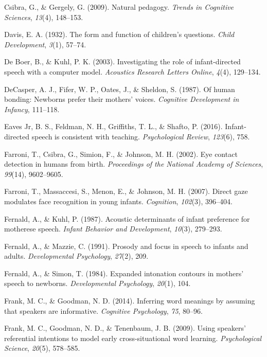 \documentclass[a4paper,man,apacite,floatsintext]{apa6}
\begin{document}
\hypertarget{ref-csibra2009natural}{}
Csibra, G., \& Gergely, G. (2009). Natural pedagogy. \emph{Trends in
Cognitive Sciences}, \emph{13}(4), 148--153.

\hypertarget{ref-davis1932form}{}
Davis, E. A. (1932). The form and function of children's questions.
\emph{Child Development}, \emph{3}(1), 57--74.

\hypertarget{ref-de2003investigating}{}
De Boer, B., \& Kuhl, P. K. (2003). Investigating the role of
infant-directed speech with a computer model. \emph{Acoustics Research
Letters Online}, \emph{4}(4), 129--134.

\hypertarget{ref-decasper1987human}{}
DeCasper, A. J., Fifer, W. P., Oates, J., \& Sheldon, S. (1987). Of
human bonding: Newborns prefer their mothers' voices. \emph{Cognitive
Development in Infancy}, 111--118.

\hypertarget{ref-eaves2016infant}{}
Eaves Jr, B. S., Feldman, N. H., Griffiths, T. L., \& Shafto, P. (2016).
Infant-directed speech is consistent with teaching. \emph{Psychological
Review}, \emph{123}(6), 758.

\hypertarget{ref-farroni2002eye}{}
Farroni, T., Csibra, G., Simion, F., \& Johnson, M. H. (2002). Eye
contact detection in humans from birth. \emph{Proceedings of the
National Academy of Sciences}, \emph{99}(14), 9602--9605.

\hypertarget{ref-farroni2007direct}{}
Farroni, T., Massaccesi, S., Menon, E., \& Johnson, M. H. (2007). Direct
gaze modulates face recognition in young infants. \emph{Cognition},
\emph{102}(3), 396--404.

\hypertarget{ref-fernald1987acoustic}{}
Fernald, A., \& Kuhl, P. (1987). Acoustic determinants of infant
preference for motherese speech. \emph{Infant Behavior and Development},
\emph{10}(3), 279--293.

\hypertarget{ref-fernald1991prosody}{}
Fernald, A., \& Mazzie, C. (1991). Prosody and focus in speech to
infants and adults. \emph{Developmental Psychology}, \emph{27}(2), 209.

\hypertarget{ref-fernald1984expanded}{}
Fernald, A., \& Simon, T. (1984). Expanded intonation contours in
mothers' speech to newborns. \emph{Developmental Psychology},
\emph{20}(1), 104.

\hypertarget{ref-frank2014inferring}{}
Frank, M. C., \& Goodman, N. D. (2014). Inferring word meanings by
assuming that speakers are informative. \emph{Cognitive Psychology},
\emph{75}, 80--96.

\hypertarget{ref-frank2009using}{}
Frank, M. C., Goodman, N. D., \& Tenenbaum, J. B. (2009). Using
speakers' referential intentions to model early cross-situational word
learning. \emph{Psychological Science}, \emph{20}(5), 578--585.
\end{document}

